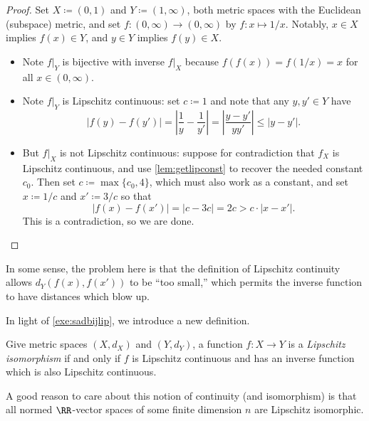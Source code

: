 \documentclass[../notes.tex]{subfiles}
\begin{document}
\begin{proof}
	Set $X\coloneqq(0,1)$ and $Y\coloneqq(1,\infty)$, both metric spaces with the Euclidean (subspace) metric, and set $f\colon(0,\infty)\to(0,\infty)$ by $f\colon x\mapsto1/x$. Notably, $x\in X$ implies $f(x)\in Y$, and $y\in Y$ implies $f(y)\in X$.
	\begin{itemize}
		\item Note $f|_Y$ is bijective with inverse $f|_X$ because $f(f(x))=f(1/x)=x$ for all $x\in(0,\infty)$.
		\item Note $f|_Y$ is Lipschitz continuous: set $c\coloneqq1$ and note that any $y,y'\in Y$ have
		\[|f(y)-f(y')|=\left|\frac1y-\frac1{y'}\right|=\left|\frac{y-y'}{yy'}\right|\le|y-y'|.\]
		\item But $f|_X$ is not Lipschitz continuous: suppose for contradiction that $f_X$ is Lipschitz continuous, and use \autoref{lem:getlipconst} to recover the needed constant $c_0$. Then set $c\coloneqq\max\{c_0,4\}$, which must also work as a constant, and set $x\coloneqq1/c$ and $x'\coloneqq3/c$ so that
		\[|f(x)-f(x')|=\left|c-3c\right|=2c>c\cdot|x-x'|.\]
		This is a contradiction, so we are done.
		\qedhere
	\end{itemize}
\end{proof}
\begin{remark}[Nir]
	In some sense, the problem here is that the definition of Lipschitz continuity allows $d_Y(f(x),f(x'))$ to be ``too small,'' which permits the inverse function to have distances which blow up.
\end{remark}
In light of \autoref{exe:sadbijlip}, we introduce a new definition.
\begin{definition}
	Give metric spaces $(X,d_X)$ and $(Y,d_Y)$, a function $f\colon X\to Y$ is a \textit{Lipschitz isomorphism} if and only if $f$ is Lipschitz continuous and has an inverse function which is also Lipschitz continuous.
\end{definition}
\begin{remark}
	A good reason to care about this notion of continuity (and isomorphism) is that all normed $\RR$-vector spaces of some finite dimension $n$ are Lipschitz isomorphic.
\end{remark}
\end{document}
